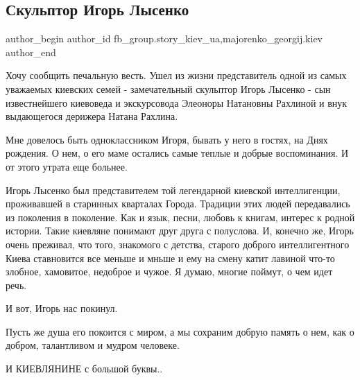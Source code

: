  
 
 
 
 
 
\subsection{Скульптор Игорь Лысенко}
\label{sec:23_07_2021.fb.fb_group.story_kiev_ua.2.skulptor_igor_lysenko}
 
\ifcmt
 author_begin
   author_id fb_group.story_kiev_ua,majorenko_georgij.kiev
 author_end
\fi

Хочу сообщить печальную весть. Ушел из жизни представитель одной из самых
уважаемых киевских семей - замечательный скульптор Игорь Лысенко - сын
известнейшего киевоведа и экскурсовода Элеоноры Натановны Рахлиной и внук
выдающегося дерижера Натана Рахлина.

\raggedcolumns
\begin{multicols}{3} %
\setlength{\parindent}{0pt}




\end{multicols} %

Мне довелось быть одноклассником Игоря, бывать у него в гостях, на Днях
рождения. О нем, о его маме остались самые теплые и добрые воспоминания. И от
этого утрата еще больнее.

Игорь Лысенко был представителем той легендарной киевской интеллигенции,
проживавшей в старинных кварталах Города. Традиции этих людей передавались из
поколения в поколение. Как и язык, песни, любовь к книгам, интерес к родной
истории. Такие киевляне понимают друг друга с полуслова. И, конечно же, Игорь
очень преживал, что того, знакомого с детства, старого доброго интеллигентного
Киева ставновится все меньше и мньше и ему на смену катит лавиной что-то
злобное, хамовитое, недоброе и чужое. Я думаю, многие поймут, о чем идет речь.

И вот, Игорь нас покинул.

Пусть же душа его покоится с миром, а мы сохраним добрую память о нем, как о
добром, талантливом и мудром человеке.

И КИЕВЛЯНИНЕ с большой буквы..
